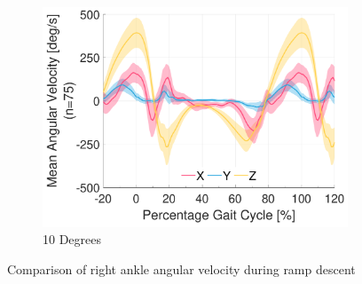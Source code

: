 \begin{figure}[!p]
\begin{subfigure}[b]{0.3\textwidth}
        \includegraphics[width=\textwidth]{content/3-Methods/ramp/ch3_ramp_10_degree_activity_ramp_down_gyro_r_ankle.pdf}
        \caption{10 Degrees}
    \end{subfigure}
    \caption{Comparison of right ankle angular velocity during ramp descent}
    \label{fig:ramp_down_gyro_comparison}
\end{figure}

